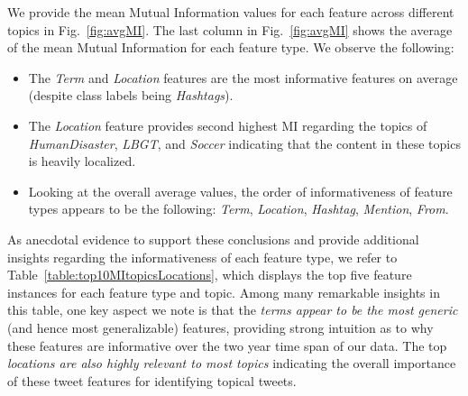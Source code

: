 We provide the mean Mutual Information
values for each feature across different topics in Fig.~\ref{fig:avgMI}.
The last column in Fig.~\ref{fig:avgMI} shows the
average of the mean Mutual Information for each feature type.  We observe
the following:
\begin{itemize}%
\item The \textit{Term} and \textit{Location} features are the most informative features on average (despite class labels being \emph{Hashtags}).%
\item The \textit{Location} feature provides second highest MI regarding the topics of \textit{HumanDisaster}, \textit{LBGT}, and \textit{Soccer} indicating that the content in these topics is heavily localized.
\item Looking at the overall average values, the order of informativeness of feature types appears to be the following: \textit{Term}, \textit{Location}, \textit{Hashtag}, \textit{Mention}, \textit{From}.
\end{itemize}

As anecdotal evidence to support these conclusions and provide additional insights regarding
the informativeness of each feature type, we refer to
Table~\ref{table:top10MItopicsLocations}, which displays the top five feature instances
for each feature type and topic.  Among many remarkable insights in this table, one key aspect  
we note is that the \emph{terms appear to be the most generic} (and hence most generalizable) features,
providing strong intuition as to why these features are informative over the two year time
span of our data.  The top \emph{locations are also highly relevant to most topics} indicating
the overall importance of these tweet features for identifying topical tweets.


